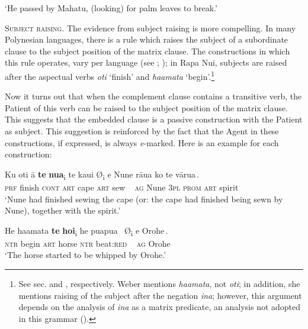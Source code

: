 \glt 
‘He passed by Mahatu, (looking) for palm leaves to break.’ \textstyleExampleref{[R304.111]} 
\z

\textsc{Subject raising.} The evidence from subject raising is more compelling. In many Polynesian languages, there is a rule which raises the subject of a subordinate clause to the subject position of the matrix clause. The constructions in which this rule operates, vary per language (see \citealt[132]{Chung1978}; \citealt[57]{WeberN2003}); in Rapa Nui, subjects are raised after the aspectual verbs \textit{oti} ‘finish’ and \textit{\mbox{ha{\ꞌ}amata}} ‘begin’.\footnote{\label{fn:413}See sec.  and , respectively. Weber mentions \textit{ha{\ꞌ}amata}, not \textit{oti}; in addition, she mentions raising of the subject after the negation \textit{{\ꞌ}ina}; however, this argument depends on the analysis of \textit{{\ꞌ}ina} as a matrix predicate, an analysis not adopted in this grammar ().} 

Now it turns out that when the complement clause contains a transitive verb, the Patient of this verb can be raised to the subject position of the matrix clause. This suggests that the embedded clause is a passive construction with the Patient as subject. This suggestion is reinforced by the fact that the Agent in these constructions, if expressed, is always \textit{e}{}-marked. Here is an example for each construction:

\ea\label{ex:8.51}
\gll Ku oti {\ꞌ}ā \textbf{te} \textbf{nua}\textsubscript{\textup{i}} {\ob}te kaui \textup{Ø}\textsubscript{\textup{i}} e Nune rāua ko te vārua\,{\cb}.\\
\textsc{prf} finish \textsc{cont} \textsc{art} cape {\db}\textsc{art} sew ~ \textsc{ag} Nune \textsc{3pl} \textsc{prom} \textsc{art} spirit\\

\glt 
‘Nune had finished sewing the cape (or: the cape had finished being sewn by Nune), together with the spirit.’ \textstyleExampleref{[Mtx-7-09.051]}
\z

\ea\label{ex:8.52}
\gll He ha{\ꞌ}amata \textbf{te} \textbf{hoi}\textsubscript{\textup{i}} {\ob}he pu{\ꞌ}apu{\ꞌ}a ~\textup{Ø}\textsubscript{\textup{i}} e {\ꞌ}Orohe\,{\cb}.\\
\textsc{ntr} begin \textsc{art} horse {\db}\textsc{ntr} beat:\textsc{red} ~ \textsc{ag} Orohe\\

\glt
‘The horse started to be whipped by Orohe.’  
\z

